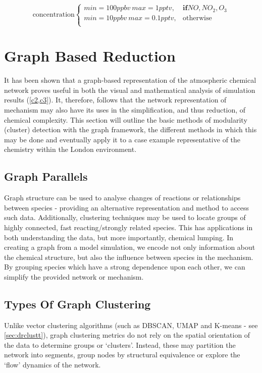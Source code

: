\begin{equation}
\text{concentration}
    \begin{cases}
      min = 100ppbv \ max=1pptv , & \mathbf{if} NO,NO_2,O_3\\
      min = 10ppbv \ max=0.1pptv , & \text{otherwise}\\
    \end{cases}
\label{eqn:icslhs}
  \end{equation}
\section{Graph Based Reduction}\label{sec:graphreduction}
It has been shown that a graph-based representation of the atmospheric chemical network proves useful in both the visual and mathematical analysis of simulation results (\autoref{c2,c3}). It, therefore, follows that the network representation of mechanism may also have its uses in the simplification, and thus reduction, of chemical complexity.  This section will outline the basic methods of modularity (cluster) detection with the graph framework, the different methods in which this may be done and eventually apply it to a case example representative of the chemistry within the London environment.




\subsection{Graph Parallels}

Graph structure can be used to analyse changes of reactions or relationships between species - providing an alternative representation and method to access such data. Additionally, clustering techniques may be used to locate groups of highly connected, fast reacting/strongly related species. This has applications in both understanding the data, but more importantly, chemical lumping. In creating a graph from a model simulation, we encode not only information about the chemical structure, but also the influence between species in the mechanism. By grouping species which have a strong dependence upon each other, we can simplify the provided network or mechanism.

 \subsection{Types Of Graph Clustering}
Unlike vector clustering algorithms (such as DBSCAN, UMAP and K-means - see \autoref{sec:drclustt}), graph clustering metrics do not rely on the spatial orientation of the data to determine groups or `clusters'. Instead, these may partition the network into segments, group nodes by structural equivalence or explore the `flow' dynamics of the network.

